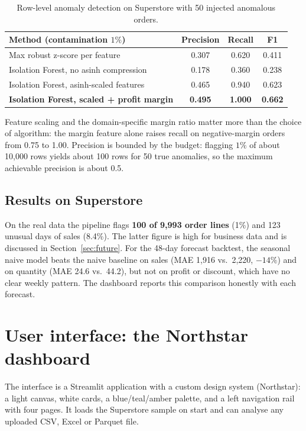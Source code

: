 \documentclass[11pt,a4paper]{article}
\begin{document}
\begin{table}[H]
\centering\small
\begin{tabular}{@{}lccc@{}}
\toprule
Method (contamination $1\%$) & Precision & Recall & F1 \\
\midrule
Max robust z-score per feature           & 0.307 & 0.620 & 0.411 \\
Isolation Forest, no asinh compression   & 0.178 & 0.360 & 0.238 \\
Isolation Forest, asinh-scaled features  & 0.465 & 0.940 & 0.623 \\
\textbf{Isolation Forest, scaled + profit margin} & \textbf{0.495} & \textbf{1.000} & \textbf{0.662} \\
\bottomrule
\end{tabular}
\caption{Row-level anomaly detection on Superstore with 50 injected anomalous orders.}
\end{table}

\noindent
Feature scaling and the domain-specific margin ratio matter more than the choice of algorithm: the margin feature
alone raises recall on negative-margin orders from 0.75 to 1.00. Precision is bounded by the budget: flagging
$1\%$ of about 10{,}000 rows yields about 100 rows for 50 true anomalies, so the maximum achievable precision is
about 0.5.

\subsection{Results on Superstore}
On the real data the pipeline flags \textbf{100 of 9{,}993 order lines} (1\%) and 123 unusual days of sales (8.4\%).
The latter figure is high for business data and is discussed in Section~\ref{sec:future}. For the 48-day forecast
backtest, the seasonal naive model beats the naive baseline on sales (MAE 1{,}916 vs.\ 2{,}220, $-14\%$) and on quantity
(MAE 24.6 vs.\ 44.2), but not on profit or discount, which have no clear weekly pattern. The dashboard reports this
comparison honestly with each forecast.

\section{User interface: the Northstar dashboard}

The interface is a Streamlit application with a custom design system (Northstar): a light canvas, white cards,
a blue/teal/amber palette, and a left navigation rail with four pages. It loads the Superstore sample on start
and can analyse any uploaded CSV, Excel or Parquet file.
\end{document}
